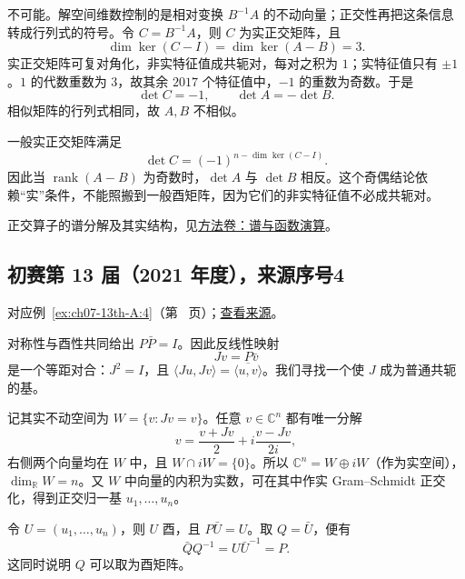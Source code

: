 \documentclass[12pt,fontset=fandol]{ctexart}
\begin{document}
\begin{solve}

不可能。解空间维数控制的是相对变换 $B^{-1}A$ 的不动向量；正交性再把这条信息转成行列式的符号。令 $C=B^{-1}A$，则 $C$ 为实正交矩阵，且
\[
\dim\ker(C-I)=\dim\ker(A-B)=3.
\]
实正交矩阵可复对角化，非实特征值成共轭对，每对之积为 $1$；实特征值只有 $\pm1$。$1$ 的代数重数为 $3$，故其余 $2017$ 个特征值中，$-1$ 的重数为奇数。于是
\[
\det C=-1,\qquad \det A=-\det B.
\]
相似矩阵的行列式相同，故 $A,B$ 不相似。

\end{solve}

\begin{remark}[方法与条件]

一般实正交矩阵满足
\[
\det C=(-1)^{n-\dim\ker(C-I)}.
\]
因此当 $\operatorname{rank}(A-B)$ 为奇数时，$\det A$ 与 $\det B$ 相反。这个奇偶结论依赖“实”条件，不能照搬到一般酉矩阵，因为它们的非实特征值不必成共轭对。

正交算子的谱分解及其实结构，见\hyperref[app:linear-spectral]{方法卷：谱与函数演算}。

\end{remark}

\subsection{初赛第 13 届（2021 年度），来源序号4}\label{ans:ch07-13th-A:4}\label{pr:ch07-13th-A:4}

对应例~\ref{ex:ch07-13th-A:4}（第~\pageref{ex:ch07-13th-A:4} 页）；\href{https://github.com/lzxcr/cmc-mathematics/blob/64916fa1fdbc3e444a652eca204d5669058ee321/src/problems/preliminary/13/04.md}{查看来源}。

\begin{solve}

对称性与酉性共同给出 $P\bar P=I$。因此反线性映射
\[
Jv=P\bar v
\]
是一个等距对合：$J^2=I$，且 $\langle Ju,Jv\rangle=\overline{\langle u,v\rangle}$。我们寻找一个使 $J$ 成为普通共轭的基。

记其实不动空间为 $W=\{v:Jv=v\}$。任意 $v\in\mathbb C^n$ 都有唯一分解
\[
v=\frac{v+Jv}{2}+i\frac{v-Jv}{2i},
\]
右侧两个向量均在 $W$ 中，且 $W\cap iW=\{0\}$。所以 $\mathbb C^n=W\oplus iW$（作为实空间），$\dim_{\mathbb R}W=n$。又 $W$ 中向量的内积为实数，可在其中作实 Gram--Schmidt 正交化，得到正交归一基 $u_1,\ldots,u_n$。

令 $U=(u_1,\ldots,u_n)$，则 $U$ 酉，且 $P\bar U=U$。取 $Q=\bar U$，便有
\[
\bar Q Q^{-1}=U\bar U^{-1}=P.
\]
这同时说明 $Q$ 可以取为酉矩阵。

\end{solve}
\end{document}
